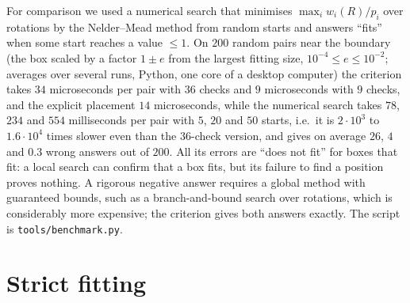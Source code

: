 \documentclass[11pt]{article}
\theoremstyle{definition}
\theoremstyle{remark}
\begin{document}
For comparison we used a numerical search that minimises $\max_iw_i(R)/p_i$ over rotations by the
Nelder--Mead method from random starts and answers ``fits'' when some start reaches a value $\le1$.
On $200$ random pairs near the boundary (the box scaled by a factor $1\pm e$ from the largest fitting
size, $10^{-4}\le e\le10^{-2}$; averages over several runs, Python, one core of a desktop computer)
the criterion takes $34$ microseconds per pair with $36$ checks and $9$ microseconds with $9$ checks,
and the explicit placement $14$ microseconds, while the numerical search takes $78$, $234$ and $554$
milliseconds per pair with $5$, $20$ and $50$ starts, i.e.\ it is $2\cdot10^3$ to $1.6\cdot10^4$ times
slower even than the $36$-check version, and gives on average $26$, $4$ and $0.3$ wrong answers
out of $200$. All
its errors are ``does not fit'' for boxes that fit: a local search can confirm that a box fits, but its
failure to find a position proves nothing. A rigorous negative answer requires a global method with
guaranteed bounds, such as a branch-and-bound search over rotations, which is considerably more
expensive; the criterion gives both answers exactly. The script is \texttt{tools/benchmark.py}.

\section{Strict fitting}\label{sec:strict}
\end{document}

